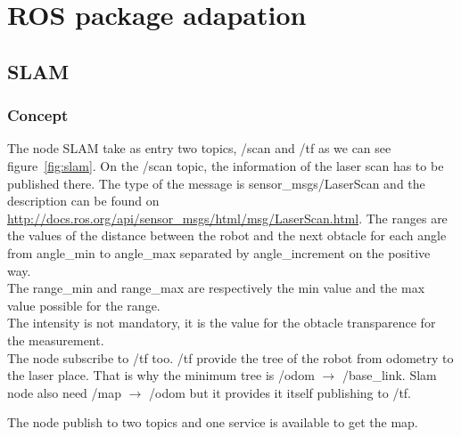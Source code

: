 \section{ROS package adapation}
\subsection{SLAM}
\subsubsection{Concept}\label{sec:slam_functionning}
The node SLAM take as entry two topics, /scan and /tf as we can see figure~\ref{fig:slam}. On the /scan topic, the information of the laser scan has to be published there. The type of the message is sensor\_msgs/LaserScan and the description can be found on \url{http://docs.ros.org/api/sensor_msgs/html/msg/LaserScan.html}. The ranges are the values of the distance between the robot and the next obtacle for each angle from angle\_min to angle\_max separated by angle\_increment on the positive way.\\
The range\_min and range\_max are respectively the min value and the max value possible for the range.\\
The intensity is not mandatory, it is the value for the obtacle transparence for the measurement.\\

The node subscribe to /tf too. /tf provide the tree of the robot from odometry to the laser place. That is why the minimum tree is /odom $\rightarrow$ /base\_link. Slam node also need /map $\rightarrow$ /odom but it provides it itself publishing to /tf.

The node publish to two topics and one service is available to get the map.\\

\noindent\begin{minipage}{\linewidth}%
\label{fig:slam}%
\end{minipage}

